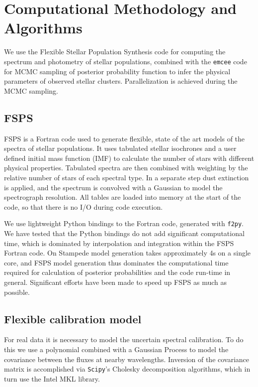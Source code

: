 \documentclass[11pt,preprint]{aastex}
\begin{document}
\section{ Computational Methodology and Algorithms}
We use the Flexible Stellar Population Synthesis \citep[FSPS][]{fspsI, fspsIII} code for computing the spectrum and photometry of stellar populations, combined with the \texttt{emcee} code for MCMC sampling of posterior probability function to infer the physical parameters of observed stellar clusters.  Parallelization is achieved during the MCMC sampling.

\subsection{FSPS}
FSPS is a Fortran code used to generate flexible, state of the art models of the spectra of stellar populations.  It uses tabulated stellar isochrones and a user defined initial mass function (IMF) to calculate the number of stars with different physical properties.  Tabulated spectra are then combined with weighting by the relative number of stars of each spectral type.  In a separate step dust extinction is applied, and the spectrum is convolved with a Gaussian to model the spectrograph resolution.  All tables are loaded into memory at the start of the code, so that there is no I/O during code execution.

We use lightweight Python bindings to the Fortran code, generated with \texttt{f2py}.  We have tested that the Python bindings do not add significant computational time, which is dominated by interpolation and integration within the FSPS Fortran code.  On Stampede model generation takes approximately 4s on a single core, and FSPS model generation thus dominates the computational time required for calculation of posterior probabilities and the code run-time in general. Significant efforts have been made to speed up FSPS as much as possible.

\subsection{Flexible calibration model}
For real data it is necessary to model the uncertain spectral calibration.  To do this we use a polynomial combined with a Gaussian Process \citep[e.g.,][]{RW} to model the covariance between the fluxes at nearby wavelengths.  Inversion of the covariance matrix is accomplished via \texttt{Scipy}'s Cholesky decomposition algorithms, which in turn use the Intel MKL library.
\end{document}
